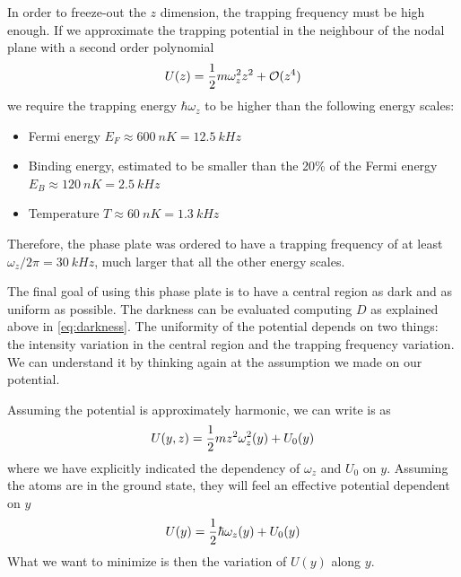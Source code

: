 In order to freeze-out the $z$ dimension, the trapping frequency must be high enough. If we approximate the trapping potential in the neighbour of the nodal plane with a second order polynomial
\begin{equation}
    \label{eq:trapping_frequency}
    U(z) = \frac{1}{2} m \omega_z^2 z^2 + \mathcal{O}(z^4)
\end{equation}
we require the trapping energy $\hbar \omega_z$ to be higher than the following energy scales:
\begin{itemize}
    \item Fermi energy $E_F \approx \SI{600}{nK} = \SI{12.5}{kHz}$
    \item Binding energy, estimated to be smaller than the 20\% of the Fermi energy $E_B \approx \SI{120}{nK} = \SI{2.5}{kHz}$
    \item Temperature $T \approx \SI{60}{nK} = \SI{1.3}{kHz}$
\end{itemize}
Therefore, the phase plate was ordered to have a trapping frequency of at least $\omega_z / 2\pi = \SI{30}{kHz}$, much larger that all the other energy scales.

The final goal of using this phase plate is to have a central region as dark and as uniform as possible. The darkness can be evaluated computing $D$ as explained above in \cref{eq:darkness}. The uniformity of the potential depends on two  things: the intensity variation in the central region and the trapping frequency variation. We can understand it by thinking again at the assumption we made on our potential.

Assuming the potential is approximately harmonic, we can write is as
\begin{equation}
    U(y,z) = \frac{1}{2} m z^2\omega_z^2(y) + U_0(y)
\end{equation}
where we have explicitly indicated the dependency of $\omega_z$ and $U_0$ on $y$. Assuming the atoms are in the ground state, they will feel an effective potential dependent on $y$
\begin{equation}
    \label{eq:effectivr_potential}
    U(y) = \frac{1}{2} \hbar \omega_z(y) + U_0(y)
\end{equation}
What we want to minimize is then the variation of $U(y)$ along $y$.